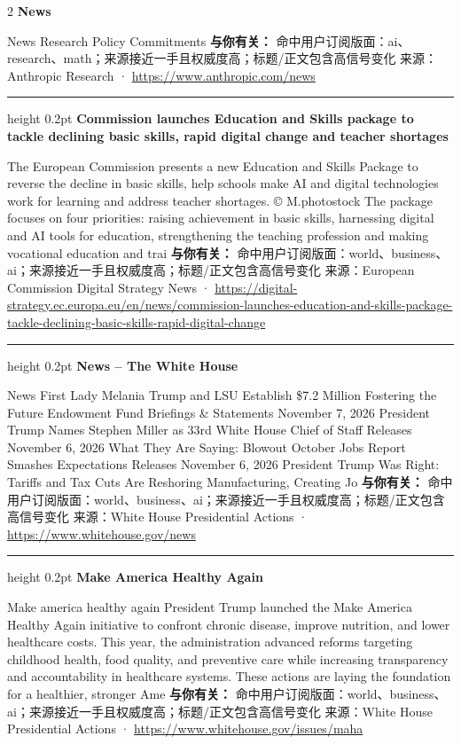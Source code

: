 \documentclass[10.5pt]{ctexart}
\begin{document}
\begin{multicols}{2}
{\large\bfseries News}\par
News Research Policy Commitments
\textbf{与你有关：} 命中用户订阅版面：ai、research、math；来源接近一手且权威度高；标题/正文包含高信号变化
{\footnotesize\color{ormuted} 来源：Anthropic Research · \url{https://www.anthropic.com/news}}
\vspace{2mm}
\hrule height 0.2pt
\vspace{2mm}
{\large\bfseries Commission launches Education and Skills package to tackle declining basic skills, rapid digital change and teacher shortages}\par
The European Commission presents a new Education and Skills Package to reverse the decline in basic skills, help schools make AI and digital technologies work for learning and address teacher shortages. © M.photostock The package focuses on four priorities: raising achievement in basic skills, harnessing digital and AI tools for education, strengthening the teaching profession and making vocational education and trai
\textbf{与你有关：} 命中用户订阅版面：world、business、ai；来源接近一手且权威度高；标题/正文包含高信号变化
{\footnotesize\color{ormuted} 来源：European Commission Digital Strategy News · \url{https://digital-strategy.ec.europa.eu/en/news/commission-launches-education-and-skills-package-tackle-declining-basic-skills-rapid-digital-change}}
\vspace{2mm}
\hrule height 0.2pt
\vspace{2mm}
{\large\bfseries News – The White House}\par
News First Lady Melania Trump and LSU Establish \$7.2 Million Fostering the Future Endowment Fund Briefings \& Statements November 7, 2026 President Trump Names Stephen Miller as 33rd White House Chief of Staff Releases November 6, 2026 What They Are Saying: Blowout October Jobs Report Smashes Expectations Releases November 6, 2026 President Trump Was Right: Tariffs and Tax Cuts Are Reshoring Manufacturing, Creating Jo
\textbf{与你有关：} 命中用户订阅版面：world、business、ai；来源接近一手且权威度高；标题/正文包含高信号变化
{\footnotesize\color{ormuted} 来源：White House Presidential Actions · \url{https://www.whitehouse.gov/news}}
\vspace{2mm}
\hrule height 0.2pt
\vspace{2mm}
{\large\bfseries Make America Healthy Again}\par
Make america healthy again President Trump launched the Make America Healthy Again initiative to confront chronic disease, improve nutrition, and lower healthcare costs. This year, the administration advanced reforms targeting childhood health, food quality, and preventive care while increasing transparency and accountability in healthcare systems. These actions are laying the foundation for a healthier, stronger Ame
\textbf{与你有关：} 命中用户订阅版面：world、business、ai；来源接近一手且权威度高；标题/正文包含高信号变化
{\footnotesize\color{ormuted} 来源：White House Presidential Actions · \url{https://www.whitehouse.gov/issues/maha}}
\end{multicols}
\end{document}
